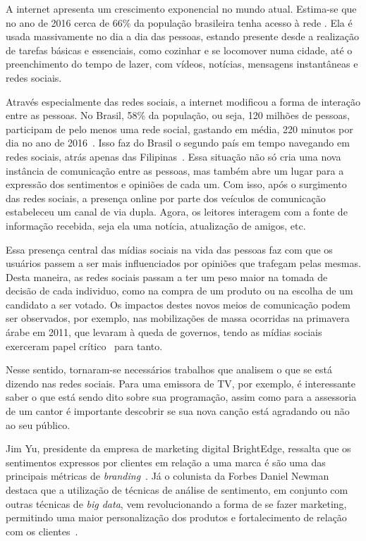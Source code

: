 
A internet apresenta um crescimento exponencial no mundo atual.
Estima-se que no ano de 2016 cerca de 66\% da população brasileira tenha acesso à rede \cite{social17}.
Ela é usada massivamente no dia a dia das pessoas, estando presente desde a realização de tarefas básicas e essenciais,
como cozinhar e se locomover numa cidade, até o preenchimento do tempo de lazer, com vídeos, notícias, mensagens
instantâneas e redes sociais.

Através especialmente das redes sociais, a internet modificou a forma de interação entre as pessoas.
No Brasil, 58\% da população, ou seja, 120 milhões de pessoas, participam de pelo menos uma rede social, gastando em
média, 220 minutos por dia no ano de 2016~\cite{social17}.
Isso faz do Brasil o segundo país em tempo navegando em redes sociais, atrás apenas das Filipinas~\cite{social17}.
Essa situação não só cria uma nova instância de comunicação entre as pessoas, mas também abre um lugar para a expressão
dos sentimentos e opiniões de cada um.
Com isso, após o surgimento das redes sociais, a presença online por parte dos veículos de comunicação estabeleceu
um canal de via dupla.
Agora, os leitores interagem com a fonte de informação recebida, seja ela uma notícia, atualização de amigos, etc.

Essa presença central das mídias sociais na vida das pessoas faz com que os usuários passem a ser mais influenciados
por opiniões que trafegam pelas mesmas.
Desta maneira, as redes sociais passam a ter um peso maior na tomada de decisão de cada individuo, como na compra de
um produto ou na escolha de um candidato a ser votado.
Os impactos destes novos meios de comunicação podem ser observados, por exemplo, nas mobilizações de massa ocorridas na
primavera árabe em 2011, que levaram à queda de governos, tendo as mídias sociais exerceram papel
crítico~\cite{mourtada11} para tanto.

Nesse sentido, tornaram-se necessários trabalhos que analisem o que se está dizendo nas redes sociais.
Para uma emissora de TV, por exemplo, é interessante saber o que está sendo dito sobre sua programação, assim como para
a assessoria de um cantor é importante descobrir se sua nova canção está agradando ou não ao seu público.

Jim Yu, presidente da empresa de marketing digital BrightEdge, ressalta que os sentimentos expressos por clientes em
relação a uma marca é são uma das principais métricas de \textit{branding}~\cite{marketingland}.
Já o colunista da Forbes Daniel Newman destaca que a utilização de técnicas de análise de sentimento, em conjunto com
outras técnicas de \textit{big data}, vem revolucionando a forma de se fazer marketing, permitindo uma maior
personalização dos produtos e fortalecimento de relação com os clientes~\cite{newman16}.

